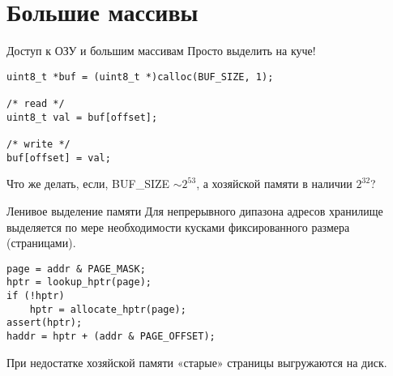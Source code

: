 \section{Большие массивы}

\begin{frame}[fragile]{Доступ к ОЗУ и большим массивам}
Просто выделить на куче!
\begin{verbatim}
uint8_t *buf = (uint8_t *)calloc(BUF_SIZE, 1);

/* read */
uint8_t val = buf[offset];

/* write */
buf[offset] = val;
\end{verbatim}
\pause
Что же делать, если, BUF_SIZE $\sim 2^{53}$, а хозяйской памяти в наличии $2^{32}$?
\end{frame}

\begin{frame}[fragile]{Ленивое выделение памяти}
Для непрерывного дипазона адресов хранилище выделяется по мере необходимости кусками фиксированного размера (страницами).

\begin{verbatim}
page = addr & PAGE_MASK;
hptr = lookup_hptr(page);
if (!hptr)
    hptr = allocate_hptr(page);
assert(hptr);
haddr = hptr + (addr & PAGE_OFFSET);
\end{verbatim}
При недостатке хозяйской памяти «старые» страницы выгружаются на диск.
\end{frame}

